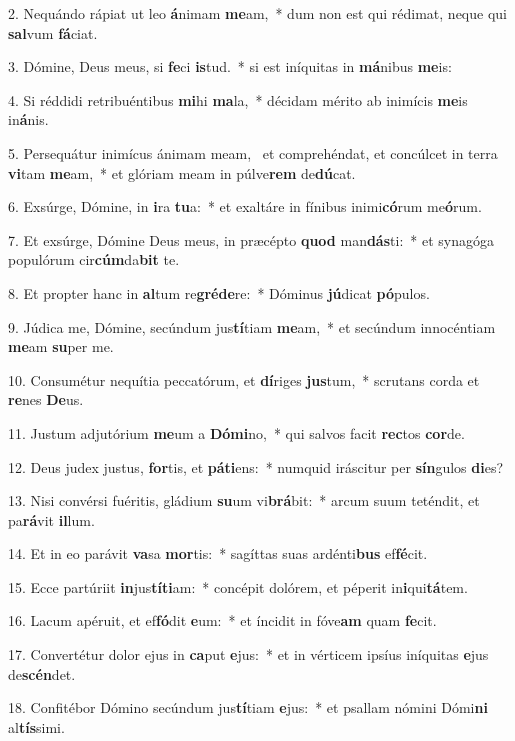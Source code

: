 2. Nequándo rápiat ut leo \textbf{á}nimam \textbf{me}am,~*  dum non est qui rédimat, neque qui \textbf{sal}vum \textbf{fá}ciat.\

3. Dómine, Deus meus, si \textbf{fe}ci \textbf{is}tud.~*  si est iníquitas in \textbf{má}nibus \textbf{me}is:\

4. Si réddidi retribuéntibus \textbf{mi}hi \textbf{ma}la,~*  décidam mérito ab inimícis \textbf{me}is in\textbf{á}nis.\

5. Persequátur inimícus ánimam meam, \dag\  et comprehéndat, et concúlcet in terra \textbf{vi}tam \textbf{me}am,~*  et glóriam meam in púlve\textbf{rem} de\textbf{dú}cat.\

6. Exsúrge, Dómine, in \textbf{i}ra \textbf{tu}a:~*  et exaltáre in fínibus inimi\textbf{có}rum me\textbf{ó}rum.\

7. Et exsúrge, Dómine Deus meus, in præcépto \textbf{quod} man\textbf{dás}ti:~*  et synagóga populórum cir\textbf{cúm}da\textbf{bit} te.\

8. Et propter hanc in \textbf{al}tum re\textbf{gré}\textbf{de}re:~*  Dóminus \textbf{jú}dicat \textbf{pó}pulos.\

9. Júdica me, Dómine, secúndum jus\textbf{tí}tiam \textbf{me}am,~*  et secúndum innocéntiam \textbf{me}am \textbf{su}per me.\

10. Consumétur nequítia peccatórum, et \textbf{dí}riges \textbf{jus}tum,~*  scrutans corda et \textbf{re}nes \textbf{De}us.\

11. Justum adjutórium \textbf{me}um a \textbf{Dó}\textbf{mi}no,~*  qui salvos facit \textbf{rec}tos \textbf{cor}de.\

12. Deus judex justus, \textbf{for}tis, et \textbf{pá}\textbf{ti}ens:~*  numquid iráscitur per \textbf{sín}gulos \textbf{di}es?\

13. Nisi convérsi fuéritis, gládium \textbf{su}um vi\textbf{brá}bit:~*  arcum suum teténdit, et pa\textbf{rá}vit \textbf{il}lum.\

14. Et in eo parávit \textbf{va}sa \textbf{mor}tis:~*  sagíttas suas ardénti\textbf{bus} ef\textbf{fé}cit.\

15. Ecce partúriit \textbf{in}jus\textbf{tí}\textbf{ti}am:~*  concépit dolórem, et péperit in\textbf{i}qui\textbf{tá}tem.\

16. Lacum apéruit, et ef\textbf{fó}dit \textbf{e}um:~*  et íncidit in fóve\textbf{am} quam \textbf{fe}cit.\

17. Convertétur dolor ejus in \textbf{ca}put \textbf{e}jus:~*  et in vérticem ipsíus iníquitas \textbf{e}jus de\textbf{scén}det.\

18. Confitébor Dómino secúndum jus\textbf{tí}tiam \textbf{e}jus:~*  et psallam nómini Dómi\textbf{ni} al\textbf{tís}simi.\

